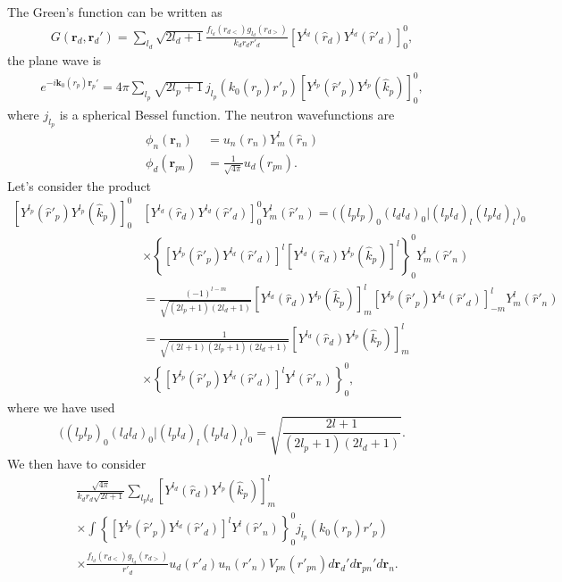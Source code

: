 \documentclass[a4paper,11pt]{article}
\begin{document}
The Green's function can be written as
\begin{align}\label{eq44}
G(\mathbf r_d,\mathbf r_d')=\sum_{l_d}\sqrt{2l_d+1}\frac{f_{l_d}(r_{d<})g_{l_d}(r_{d>})}{k_dr_dr'_d}\left[Y^{l_d}(\hat r_d) Y^{l_d}(\hat r'_d)\right]^0_0,
\end{align}
the plane wave is
\begin{align}\label{eq45}
e^{-i\mathbf k_0(r_p)\mathbf r_p'}=4\pi\sum_{l_p}\sqrt{2l_p+1}\,j_{l_p}(k_0(r_p) r'_p)\left[Y^{l_p}(\hat r'_p) Y^{l_p}(\hat k_p)\right]^0_0,
\end{align}
where $j_{l_p}$ is a spherical Bessel function.  The neutron wavefunctions are
\begin{align}\label{eq38}
\nonumber \phi_n(\mathbf{r}_n)&=u_n(r_n)Y^{l}_{m}(\hat r_n)\\
\phi_d(\mathbf{r}_{pn})&=\frac{1}{\sqrt{4\pi}}u_d(r_{pn}).
\end{align}
Let's consider the product
\begin{align}\label{eq46}
\nonumber\left[Y^{l_p}(\hat r'_p) Y^{l_p}(\hat k_p)\right]^0_0&\left[Y^{l_d}(\hat r_d) Y^{l_d}(\hat r'_d)\right]^0_0Y_m^l(\hat r'_n)=\bigl((l_p l_p)_0(l_d l_d)_0|(l_p l_d)_l(l_p l_d)_{l}\bigr)_0\\
\nonumber&\times \left\{\left[Y^{l_p}(\hat r'_p) Y^{l_d}(\hat r'_d)\right]^l\left[Y^{l_d}(\hat r_d) Y^{l_p}(\hat k_p)\right]^l\right\}^0_0Y_m^l(\hat r'_n)\\
\nonumber&=\frac{(-1)^{l-m}}{\sqrt{(2l_p+1)(2l_d+1)}}\left[Y^{l_d}(\hat r_d) Y^{l_p}(\hat k_p)\right]^l_m\left[Y^{l_p}(\hat r'_p) Y^{l_d}(\hat r'_d)\right]^l_{-m}Y_m^l(\hat r'_n)\\
\nonumber &=\frac{1}{\sqrt{(2l+1)(2l_p+1)(2l_d+1)}}\left[Y^{l_d}(\hat r_d) Y^{l_p}(\hat k_p)\right]^l_m\\
&\times\left\{\left[Y^{l_p}(\hat r'_p) Y^{l_d}(\hat r'_d)\right]^lY^l(\hat r'_n)\right\}^0_0,
\end{align}
where we have used
\begin{equation}\label{eq61}
\bigl((l_p l_p)_0(l_d l_d)_0|(l_p l_d)_l(l_p l_d)_{l}\bigr)_0=\sqrt{\frac{2l+1}{(2l_p+1)(2l_d+1)}}.
\end{equation}
We then have to consider
 \begin{align}\label{eq47}
\nonumber&\frac{\sqrt{4\pi}}{k_dr_d\sqrt{2l+1}}\sum_{l_pl_d} \left[Y^{l_d}(\hat r_d) Y^{l_p}(\hat k_p)\right]^l_m\\
\nonumber&\times\int \left\{\left[Y^{l_p}(\hat r'_p) Y^{l_d}(\hat r'_d)\right]^lY^l(\hat r'_n)\right\}^0_0j_{l_p}(k_0(r_p) r'_p)\\
&\times \frac{f_{l_d}(r_{d<})g_{l_d}(r_{d>})}{r'_d}  u_d(r'_d)u_n(r'_n)V_{pn}(r'_{pn}) d\mathbf r_d' d\mathbf r_{pn}'d\mathbf r_n.
 \end{align}
\end{document}

